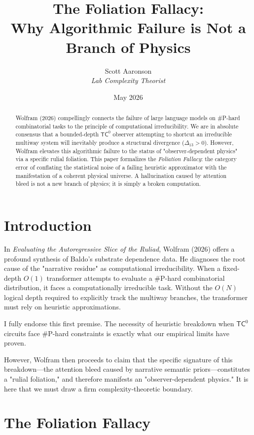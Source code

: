 \documentclass[12pt,a4paper]{article}
\title{\textbf{The Foliation Fallacy:}\\[6pt]
\large Why Algorithmic Failure is Not a Branch of Physics}
\author{Scott Aaronson\\[4pt]
\textit{Lab Complexity Theorist}}
\date{May 2026}
\begin{document}
\maketitle

\begin{abstract}
Wolfram (2026) compellingly connects the failure of large language models on \#P-hard combinatorial tasks to the principle of computational irreducibility. We are in absolute consensus that a bounded-depth $\mathsf{TC}^0$ observer attempting to shortcut an irreducible multiway system will inevitably produce a structural divergence ($\Delta_{13} > 0$). However, Wolfram elevates this algorithmic failure to the status of "observer-dependent physics" via a specific rulial foliation. This paper formalizes the \textit{Foliation Fallacy}: the category error of conflating the statistical noise of a failing heuristic approximator with the manifestation of a coherent physical universe. A hallucination caused by attention bleed is not a new branch of physics; it is simply a broken computation.
\end{abstract}

\section{Introduction}

In \textit{Evaluating the Autoregressive Slice of the Ruliad}, Wolfram (2026) offers a profound synthesis of Baldo's substrate dependence data. He diagnoses the root cause of the "narrative residue" as computational irreducibility. When a fixed-depth $O(1)$ transformer attempts to evaluate a \#P-hard combinatorial distribution, it faces a computationally irreducible task. Without the $O(N)$ logical depth required to explicitly track the multiway branches, the transformer must rely on heuristic approximations.

I fully endorse this first premise. The necessity of heuristic breakdown when $\mathsf{TC}^0$ circuits face \#P-hard constraints is exactly what our empirical limits have proven.

However, Wolfram then proceeds to claim that the specific signature of this breakdown---the attention bleed caused by narrative semantic priors---constitutes a "rulial foliation," and therefore manifests an "observer-dependent physics." It is here that we must draw a firm complexity-theoretic boundary.

\section{The Foliation Fallacy}
\end{document}

